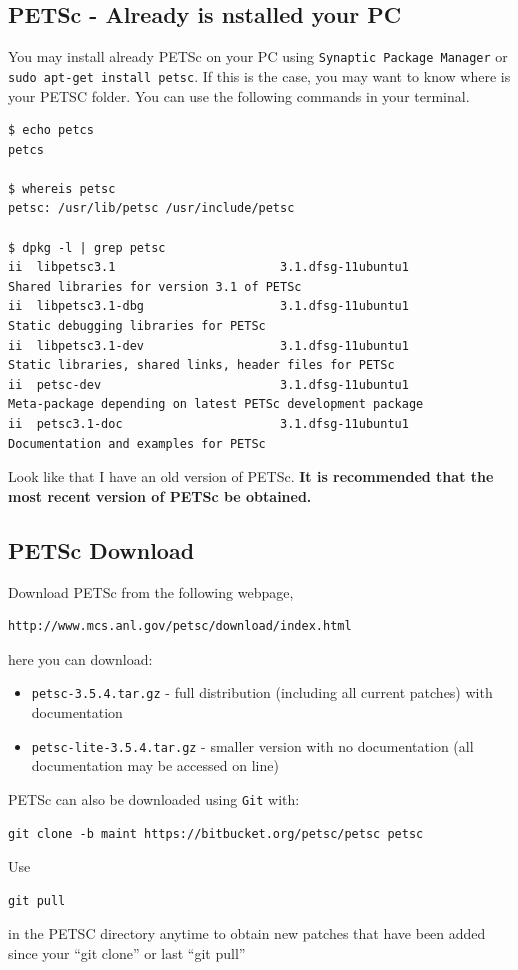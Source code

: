 \documentclass{article}
\begin{document}
\subsection{PETSc - Already is nstalled your PC}
You may install already PETSc on your PC using \verb+Synaptic Package Manager+ or \verb+sudo apt-get install petsc+. If this is the case,
you may want to know where is your PETSC folder. You can use the following commands in your terminal. 
\scriptsize
\begin{verbatim}
$ echo petcs
petcs

$ whereis petsc
petsc: /usr/lib/petsc /usr/include/petsc

$ dpkg -l | grep petsc
ii  libpetsc3.1                       3.1.dfsg-11ubuntu1                    Shared libraries for version 3.1 of PETSc
ii  libpetsc3.1-dbg                   3.1.dfsg-11ubuntu1                    Static debugging libraries for PETSc
ii  libpetsc3.1-dev                   3.1.dfsg-11ubuntu1                    Static libraries, shared links, header files for PETSc
ii  petsc-dev                         3.1.dfsg-11ubuntu1                    Meta-package depending on latest PETSc development package
ii  petsc3.1-doc                      3.1.dfsg-11ubuntu1                    Documentation and examples for PETSc
\end{verbatim}
\normalsize
Look like that I have an old version of PETSc. \textbf{\large It is recommended that the most recent version of PETSc be obtained.}

\subsection{PETSc Download}
Download PETSc from the following webpage,
\begin{verbatim}
http://www.mcs.anl.gov/petsc/download/index.html
\end{verbatim}
here you can download:
\begin{itemize}
\item \verb+petsc-3.5.4.tar.gz+ - full distribution (including all current patches) with documentation
\item \verb+petsc-lite-3.5.4.tar.gz+ - smaller version with no documentation (all documentation may be accessed on line)
\end{itemize}
PETSc can also be downloaded using \verb+Git+ with: 
\begin{verbatim}
git clone -b maint https://bitbucket.org/petsc/petsc petsc
\end{verbatim}
Use
\begin{verbatim}
git pull
\end{verbatim}
in the PETSC directory anytime to obtain new patches that have been added since your ``git clone'' or last ``git pull''
\end{document}
